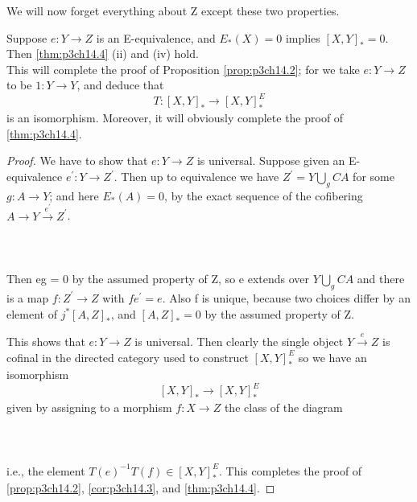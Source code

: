 \documentclass[../main]{subfiles}
\begin{document}
We will now forget everything about Z except these two properties.
\begin{lemma} \label{lem:p3ch14.11}
Suppose $e\colon  Y \to  Z $ is an E-equivalence, and  $E_{\ast}(X)=0$ implies $ \left[X,Y\right]_{\ast}=0$. Then \ref{thm:p3ch14.4} (ii) and (iv) hold. \\
This will complete the proof of Proposition \ref{prop:p3ch14.2}; for we take $e\colon  Y \to  Z $ to be  $1\colon  Y \to  Y $, and deduce that 
$$
  T\colon  \left[X,Y\right]_{\ast} \to \left[X,Y\right]^E_{\ast}  
$$ 
is an isomorphism. Moreover, it will obviously complete the proof of \ref{thm:p3ch14.4}. 
\begin{proof} 
    We have to show that $e\colon  Y \to  Z $ is universal. Suppose given an E-equivalence $e^{\prime}\colon  Y \to  Z^{\prime} $. Then up to equivalence we have $Z^{\prime}= Y \displaystyle{\bigcup_{g}} CA $ for some $g\colon  A \to  Y $; and here $E_{\ast}(A)=0$, by the exact sequence of the cofibering $A \to Y \xrightarrow{e^{\prime}} Z^{\prime}$.
    ~\\~\\
    ~\\~\\
 Then eg = 0 by the assumed property of Z, so e extends over $Y \displaystyle{\bigcup_{g}}  CA$ and there is a map $f\colon  Z^{\prime} \to  Z $ with $fe^{\prime}=e$. Also f is unique, because two choices differ by an element of $j^\ast\left[A,Z\right]_{\ast}$, and $ \left[A,Z\right]_{\ast}=0$ by the assumed property of Z.   

This shows that $e\colon  Y \to  Z $ is universal. Then clearly the single object $Y\xrightarrow{e} Z$ is cofinal in the directed category used to construct $ \left[X,Y\right]^E_{\ast}$ so we have an isomorphism
$$
  \left[X,Y\right]_\ast \to \left[X,Y\right]^E_{\ast} 
$$ 
given by assigning to a morphism $f\colon  X \to  Z $ the class of the diagram
~\\~\\
~\\~\\
i.e., the element $T(e)^{-1}T(f) \in \left[X,Y\right]^E_{\ast}$. This completes the proof of \ref{prop:p3ch14.2}, \ref{cor:p3ch14.3}, and \ref{thm:p3ch14.4}.
\end{proof}
\end{lemma}
\end{document}
